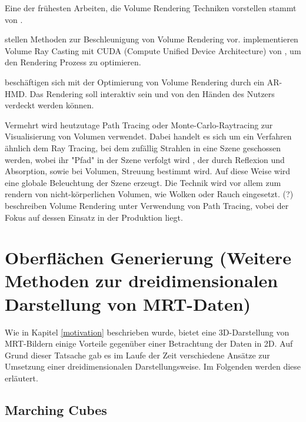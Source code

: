 Eine der frühesten Arbeiten, die Volume Rendering Techniken vorstellen stammt von \citet{Drebin88}.

\citet{Kruger03} stellen Methoden zur Beschleunigung von Volume Rendering vor.
\citet{Marsalek08} implementieren Volume Ray Casting mit CUDA (Compute Unified Device Architecture) von \citet{cuda}, um den Rendering Prozess zu optimieren.

\citet{Kutter08} beschäftigen sich mit der Optimierung von Volume Rendering durch ein AR-HMD. Das Rendering soll interaktiv sein und von den Händen des Nutzers verdeckt werden können.

Vermehrt wird heutzutage Path Tracing oder Monte-Carlo-Raytracing zur Visualisierung von Volumen verwendet. Dabei handelt es sich um ein Verfahren ähnlich dem Ray Tracing, bei dem zufällig Strahlen in eine Szene geschossen werden, wobei ihr "Pfad" in der Szene verfolgt wird , der durch Reflexion und Absorption, sowie bei Volumen, Streuung bestimmt wird. Auf diese Weise wird eine globale Beleuchtung der Szene erzeugt. Die Technik wird vor allem zum rendern von nicht-körperlichen Volumen, wie Wolken oder Rauch eingesetzt. (?) 
\citet{Fong17} beschreiben Volume Rendering unter Verwendung von Path Tracing, vobei der Fokus auf dessen Einsatz in der Produktion liegt.

\section{Oberflächen Generierung (Weitere Methoden zur dreidimensionalen Darstellung von MRT-Daten)}		 %
Wie in Kapitel \ref{motivation} beschrieben wurde, bietet eine 3D-Darstellung von MRT-Bildern einige Vorteile gegenüber einer Betrachtung der Daten in 2D. 
Auf Grund dieser Tatsache gab es im Laufe der Zeit verschiedene Ansätze zur Umsetzung einer dreidimensionalen Darstellungsweise. 
Im Folgenden werden diese erläutert. 



\subsection{Marching Cubes}
\label{marchingCubes}


